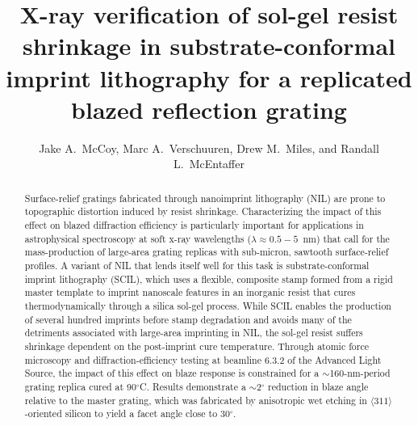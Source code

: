 \documentclass{osa-article}
\begin{document}
\title{X-ray verification of sol-gel resist shrinkage in substrate-conformal imprint lithography for a replicated blazed reflection grating}

\author{Jake A.\ McCoy, Marc A.\ Verschuuren, Drew M.\ Miles, and Randall L.\ McEntaffer}

\address{Department of Astronomy \& Astrophysics, The Pennsylvania State University, 525 Davey Laboratory, University Park, PA 16802, USA\\
Philips SCIL Nanoimprint Solutions, De Lismortel 31, 5612 AR, Eindhoven, The Netherlands}




\begin{abstract}
 Surface-relief gratings fabricated through nanoimprint lithography (NIL) are prone to topographic distortion induced by resist shrinkage. 
 Characterizing the impact of this effect on blazed diffraction efficiency is particularly important for applications in astrophysical spectroscopy at soft x-ray wavelengths ($\lambda \approx 0.5 - 5$~nm) that call for the mass-production of large-area grating replicas with sub-micron, sawtooth surface-relief profiles. 
 A variant of NIL that lends itself well for this task is substrate-conformal imprint lithography (SCIL), which uses a flexible, composite stamp formed from a rigid master template to imprint nanoscale features in an inorganic resist that cures thermodynamically through a silica sol-gel process. 
 While SCIL enables the production of several hundred imprints before stamp degradation and avoids many of the detriments associated with large-area imprinting in NIL, the sol-gel resist suffers shrinkage dependent on the post-imprint cure temperature.  
 Through atomic force microscopy and diffraction-efficiency testing at beamline 6.3.2 of the Advanced Light Source, the impact of this effect on blaze response is constrained for a $\sim$160-nm-period grating replica cured at 90$^{\circ}$C. 
 Results demonstrate a $\sim$2$^{\circ}$ reduction in blaze angle relative to the master grating, which was fabricated by anisotropic wet etching in $\langle 311 \rangle$-oriented silicon to yield a facet angle close to 30$^{\circ}$. 
\end{abstract}
\end{document}
